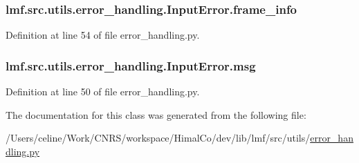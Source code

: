 \hypertarget{classlmf_1_1src_1_1utils_1_1error__handling_1_1_input_error_a41ac62579b8419be8fee90ac0b907817}{
\subsubsection[{frame\+\_\+info}]{\setlength{\rightskip}{0pt plus 5cm}lmf.\+src.\+utils.\+error\+\_\+handling.\+Input\+Error.\+frame\+\_\+info}}\label{classlmf_1_1src_1_1utils_1_1error__handling_1_1_input_error_a41ac62579b8419be8fee90ac0b907817}


Definition at line 54 of file error\+\_\+handling.\+py.

\hypertarget{classlmf_1_1src_1_1utils_1_1error__handling_1_1_input_error_a13dc7af38c991d10bbf04900ecc4a44b}{
\subsubsection[{msg}]{\setlength{\rightskip}{0pt plus 5cm}lmf.\+src.\+utils.\+error\+\_\+handling.\+Input\+Error.\+msg}}\label{classlmf_1_1src_1_1utils_1_1error__handling_1_1_input_error_a13dc7af38c991d10bbf04900ecc4a44b}


Definition at line 50 of file error\+\_\+handling.\+py.



The documentation for this class was generated from the following file\+:\begin{DoxyCompactItemize}
\item 
/\+Users/celine/\+Work/\+C\+N\+R\+S/workspace/\+Himal\+Co/dev/lib/lmf/src/utils/\hyperlink{error__handling_8py}{error\+\_\+handling.\+py}\end{DoxyCompactItemize}
